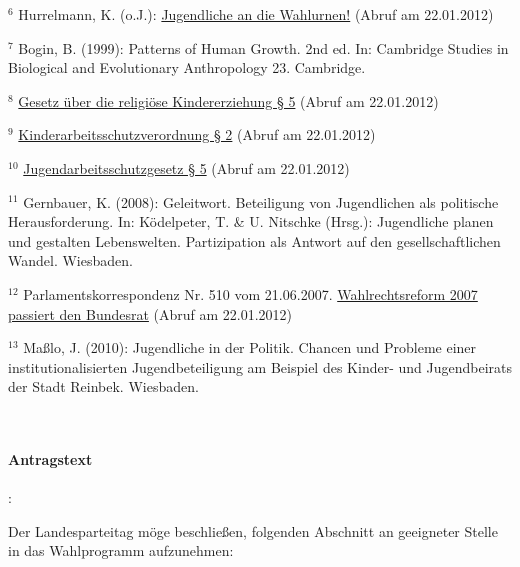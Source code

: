 {$^6$ Hurrelmann, K. (o.J.): \href{http://gedankensex.de/2011/08/23/jugendliche-an-die-wahlurnen/}{Jugendliche an die Wahlurnen!} (Abruf am 22.01.2012)

$^7$ Bogin, B. (1999): Patterns of Human Growth. 2nd ed. In: Cambridge Studies in Biological and Evolutionary Anthropology 23. Cambridge.

$^8$ \href{http://www.gesetze-im-internet.de/kerzg/__5.html}{Gesetz über die religiöse Kindererziehung § 5} (Abruf am 22.01.2012)

$^9$ \href{http://www.gesetze-im-internet.de/kindarbschv/__2.html}{Kinderarbeitsschutzverordnung § 2} (Abruf am 22.01.2012)

$^{10}$ \href{http://bundesrecht.juris.de/jarbschg/__5.html}{Jugendarbeitsschutzgesetz § 5} (Abruf am 22.01.2012)

$^{11}$ Gernbauer, K. (2008): Geleitwort. Beteiligung von Jugendlichen als politische Herausforderung. In: Ködelpeter, T. \& U. Nitschke (Hrsg.): Jugendliche planen und gestalten Lebenswelten. Partizipation als Antwort auf den gesellschaftlichen Wandel. Wiesbaden.

$^{12}$ Parlamentskorrespondenz Nr. 510 vom 21.06.2007. \href{http://www.parlinkom.gv.at/PAKT/PR/JAHR_2007/PK0510/index.shtml}{Wahlrechtsreform 2007 passiert den Bundesrat} (Abruf am 22.01.2012)

$^{13}$ Maßlo, J. (2010): Jugendliche in der Politik. Chancen und Probleme einer institutionalisierten Jugendbeteiligung am Beispiel des Kinder- und Jugendbeirats der Stadt Reinbek. Wiesbaden.
}


\\

\paragraph{Antragstext}:

Der Landesparteitag möge beschließen, folgenden Abschnitt an geeigneter Stelle in das Wahlprogramm aufzunehmen:


